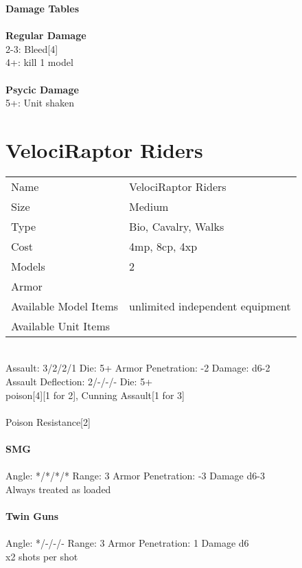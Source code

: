 {\bf Damage Tables} \\
\ \\ {\bf Regular Damage } \\
2-3: Bleed[4] \\
4+: kill 1 model \\
\ \\ {\bf Psycic Damage } \\
5+: Unit shaken \\









\pagebreak

\section{ VelociRaptor Riders }

\begin{tabular}{ll}
  Name & VelociRaptor Riders \\
  Size & Medium\\
  Type & Bio, Cavalry, Walks\\
  Cost & 4mp, 8cp, 4xp\\
  Models & 2\\
  Armor & \\
  Available Model Items & unlimited independent equipment \\
  Available Unit Items &  \\
\end{tabular}

\ \\
Assault: 3/2/2/1 Die: 5+ Armor Penetration: -2 Damage: d6-2 \\
Assault Deflection: 2/-/-/- Die: 5+\\
\indent poison[4][1 for 2], Cunning Assault[1 for 3] \\
\ \\
Poison Resistance[2]
\ \\
\ \\
{\bf SMG } \\
\ \\
Angle: */*/*/* Range: 3 Armor Penetration: -3 Damage d6-3 \\
\indent Always treated as loaded \\



\ \\
{\bf Twin Guns } \\
\ \\
Angle: */-/-/- Range: 3 Armor Penetration: 1 Damage d6 \\
\indent x2 shots per shot \\





